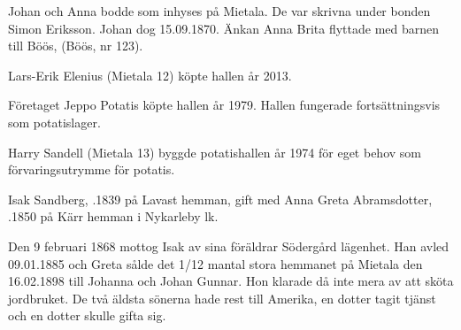Johan och Anna bodde som inhyses på Mietala. De var skrivna under bonden Simon Eriksson. Johan dog 15.09.1870. Änkan Anna Brita flyttade med barnen till Böös, (Böös, nr 123).



%


%
Lars-Erik Elenius (Mietala 12) köpte hallen år 2013.\jhvspace{}


%
Företaget Jeppo Potatis köpte hallen år 1979. Hallen fungerade fortsättningsvis som potatislager.\jhvspace{}


%
Harry Sandell (Mietala 13) byggde potatishallen år 1974 för eget behov som förvaringsutrymme för potatis.\jhvspace{}



%


%
Isak Sandberg, .1839 på Lavast hemman, gift med Anna Greta Abramsdotter,  .1850 på Kärr hemman i Nykarleby lk.
\begin{jhchildren}
  \item {}
  \item {}
  \item {}
  \item {}
  \item {}
  \item {}
  \item {}
\end{jhchildren}

Den 9 februari 1868 mottog Isak av sina föräldrar Södergård lägenhet. Han avled 09.01.1885 och Greta sålde det 1/12 mantal stora hemmanet på Mietala den 16.02.1898 till Johanna och Johan Gunnar. Hon klarade då inte mera av att sköta jordbruket. De två äldsta sönerna hade rest till Amerika, en dotter tagit tjänst och en dotter skulle gifta sig.

